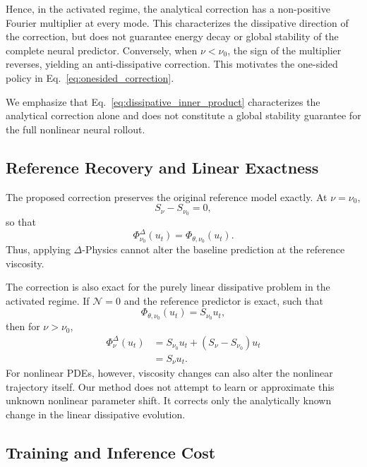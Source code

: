 \documentclass[10pt,twocolumn]{article}
\begin{document}
Hence, in the activated regime, the analytical correction has a non-positive
Fourier multiplier at every mode. This characterizes the dissipative direction
of the correction, but does not guarantee energy decay or global stability of
the complete neural predictor. Conversely, when $\nu<\nu_0$, the sign of the
multiplier reverses, yielding an anti-dissipative correction. This motivates
the one-sided policy in Eq.~\eqref{eq:onesided_correction}.

We emphasize that Eq.~\eqref{eq:dissipative_inner_product} characterizes the
analytical correction alone and does not constitute a global stability guarantee
for the full nonlinear neural rollout.

\subsection{Reference Recovery and Linear Exactness}
\label{sec:reference_recovery}

The proposed correction preserves the original reference model exactly. At
$\nu=\nu_0$,
\begin{equation}
    S_\nu-S_{\nu_0}=0,
\end{equation}
so that
\begin{equation}
    \Phi^\Delta_{\nu_0}(u_t)
    =
    \Phi_{\theta,\nu_0}(u_t).
    \label{eq:exact_reference_recovery}
\end{equation}
Thus, applying $\Delta$-Physics cannot alter the baseline prediction at the
reference viscosity.

The correction is also exact for the purely linear dissipative problem in the
activated regime. If $\mathcal{N}=0$ and the reference predictor is exact,
such that
\begin{equation}
    \Phi_{\theta,\nu_0}(u_t)=S_{\nu_0}u_t,
\end{equation}
then for $\nu>\nu_0$,
\begin{align}
    \Phi^\Delta_\nu(u_t)
    &=
    S_{\nu_0}u_t
    +
    (S_\nu-S_{\nu_0})u_t
    \nonumber\\
    &=
    S_\nu u_t.
\end{align}
For nonlinear PDEs, however, viscosity changes can also alter the nonlinear
trajectory itself. Our method does not attempt to learn or approximate this
unknown nonlinear parameter shift. It corrects only the analytically known
change in the linear dissipative evolution. 

\subsection{Training and Inference Cost}
\label{sec:complexity}
\end{document}
